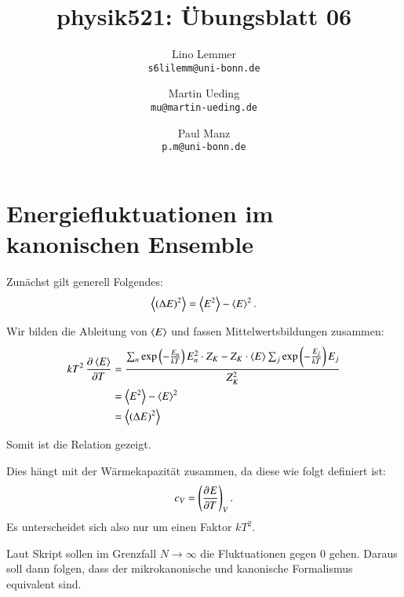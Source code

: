 

\setcounter{section}{0}
\renewcommand\thesection{H\,6.\arabic{section}}
\renewcommand\thesubsection{\thesection.\alph{subsection}}

\title{physik521: Übungsblatt 06}
\author{%
    Lino Lemmer \\ \small{\texttt{s6lilemm@uni-bonn.de}}
    \and
    Martin Ueding \\ \small{\texttt{mu@martin-ueding.de}}
    \and
    Paul Manz \\ \small{\texttt{p.m@uni-bonn.de}}
}


\maketitle

\section{Energiefluktuationen im kanonischen Ensemble}

Zunächst gilt generell Folgendes:
\[
    \left\langle(\Delta E)^2\right\rangle = \left\langle E^2\right\rangle - \left\langle E\right\rangle^2.
\]

Wir bilden die Ableitung von $\left\langle E\right\rangle$ und fassen Mittelwertsbildungen zusammen:
\begin{align*}
    kT^2 \dpd{\mw E}T
    &= \frac{\sum_n \exp\del{-\frac{E_n}{kT}} E_n^2 \cdot Z_K - Z_K \cdot \mw E \sum_j \exp\del{-\frac{E_j}{kT}} E_j}{Z_K^2} \\
    &= \mw{E^2} - \mw{E}^2 \\
    &= \mw{(\Delta E)^2}
\end{align*}

Somit ist die Relation gezeigt.

Dies hängt mit der Wärmekapazität zusammen, da diese wie folgt definiert ist:
\[
    c_V = \tdpd ETV.
\]
Es unterscheidet sich also nur um einen Faktor $kT^2$.

Laut Skript sollen im Grenzfall $N \to \infty$ die Fluktuationen gegen 0 gehen.
Daraus soll dann folgen, dass der mikrokanonische und kanonische Formalismus
equivalent sind.


